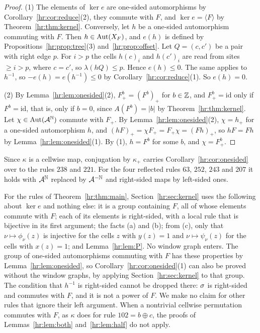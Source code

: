 \begin{proof}
(1) The elements of $\ker e$ are one-sided automorphisms by Corollary~\ref{hr:cor:reduce}(2), they commute with $F$, and $\ker e=\langle F\rangle$ by Theorem~\ref{hr:thm:kernel}. Conversely, let $h$ be a one-sided automorphism commuting with $F$. Then $h\in\operatorname{Aut}(X_F)$, and $e(h)$ is defined by Propositions~\ref{hr:prop:tree}(3) and~\ref{hr:prop:offset}. Let $Q=(c,c')$ be a pair with right edge $p$. For $i>p$ the cells $h(c)_i$ and $h(c')_i$ are read from sites $\ge i>p$, where $c=c'$, so $\lambda(hQ)\le p$. Hence $e(h)\le0$. The same applies to $h^{-1}$, so $-e(h)=e(h^{-1})\le0$ by Corollary~\ref{hr:cor:reduce}(1). So $e(h)=0$.

(2) By Lemma~\ref{hr:lem:onesided}(2), $F_+^b=(F^b)_+$ for $b\in\mathbb{Z}$, and $F_+^b=\mathrm{id}$ only if $F^b=\mathrm{id}$, that is, only if $b=0$, since $A(F^b)=|b|$ by Theorem~\ref{hr:thm:kernel}. Let $\chi\in\operatorname{Aut}(\mathcal{A}^{\mathbb N})$ commute with $F_+$. By Lemma~\ref{hr:lem:onesided}(2), $\chi=h_+$ for a one-sided automorphism $h$, and $(hF)_+=\chi F_+=F_+\chi=(Fh)_+$, so $hF=Fh$ by Lemma~\ref{hr:lem:onesided}(1). By (1), $h=F^b$ for some $b$, and $\chi=F_+^b$.
\end{proof}

Since $\kappa$ is a cellwise map, conjugation by $\kappa_+$ carries Corollary~\ref{hr:cor:onesided} over to the rules $238$ and $221$. For the four reflected rules $63$, $252$, $243$ and $207$ it holds with $\mathcal{A}^{\mathbb N}$ replaced by $\mathcal{A}^{-\mathbb N}$ and right-sided maps by left-sided ones.

\begin{remark}\label{hr:rem:general}
For the rules of Theorem~\ref{hr:thm:main}, Section~\ref{hr:sec:kernel} uses the following about $\ker e$ and nothing else: it is a group containing $F$, all of whose elements commute with $F$; each of its elements is right-sided, with a local rule that is bijective in its first argument; the facts (a) and (b); from (c), only that $\nu\mapsto\phi_\nu(z)$ is injective for the cells $z$ with $y(z)=1$ and $\nu\mapsto\psi_\nu(z)$ for the cells with $x(z)=1$; and Lemma~\ref{hr:lem:P}. No window graph enters. The group of one-sided automorphisms commuting with $F$ has these properties by Lemma~\ref{hr:lem:onesided}, so Corollary~\ref{hr:cor:onesided}(1) can also be proved without the window graphs, by applying Section~\ref{hr:sec:kernel} to that group. The condition that $h^{-1}$ is right-sided cannot be dropped there: $\sigma$ is right-sided and commutes with $F$, and it is not a power of $F$. We make no claim for other rules that ignore their left argument. When a nontrivial cellwise permutation commutes with $F$, as $\kappa$ does for rule $102=b\oplus c$, the proofs of Lemmas~\ref{hr:lem:both} and~\ref{hr:lem:half} do not apply.
\end{remark}

